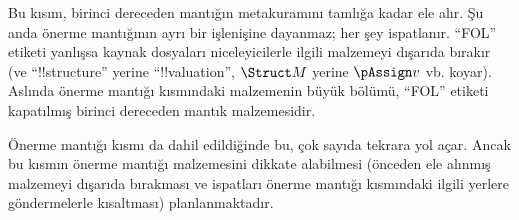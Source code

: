 \documentclass[../../include/open-logic-part]{subfiles}
\begin{document}

\begin{editorial}
  Bu kısım, birinci dereceden mantığın metakuramını tamlığa kadar ele
  alır. Şu anda önerme mantığının ayrı bir işlenişine dayanmaz; her şey
  ispatlanır. ``FOL'' etiketi yanlışsa kaynak dosyaları niceleyicilerle
  ilgili malzemeyi dışarıda bırakır (ve ``!!{structure}'' yerine
  ``!!{valuation}'', $\Struct M$ yerine $\pAssign v$ vb. koyar).
  Aslında önerme mantığı kısmındaki malzemenin büyük bölümü, ``FOL''
  etiketi kapatılmış birinci dereceden mantık malzemesidir.

  Önerme mantığı kısmı da dahil edildiğinde bu, çok sayıda tekrara yol
  açar. Ancak bu kısmın önerme mantığı malzemesini dikkate alabilmesi
  (önceden ele alınmış malzemeyi dışarıda bırakması ve ispatları önerme
  mantığı kısmındaki ilgili yerlere göndermelerle kısaltması)
  planlanmaktadır.
\end{editorial}












\OLEndPartHook
\end{document}
